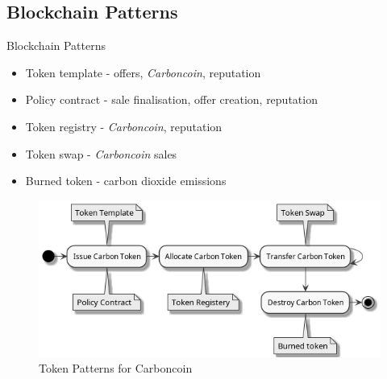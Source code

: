\subsection{Blockchain Patterns}
\begin{frame}{Blockchain Patterns}
    \begin{itemize}
        \item Token template - offers, \textit{Carboncoin}, reputation
        \item Policy contract - sale finalisation, offer creation, reputation
        \item Token registry - \textit{Carboncoin}, reputation
        \item Token swap - \textit{Carboncoin} sales
        \item Burned token - carbon dioxide emissions
    \end{itemize}
    \begin{figure}
        \caption{Token Patterns for Carboncoin}
        \centering
        \includegraphics[height=0.2\textwidth, width=0.5\textheight]
        {figures/Token}
    \end{figure}
\end{frame}
